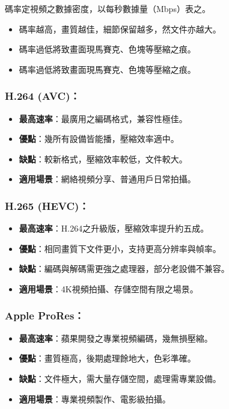 碼率定視頻之數據密度，以每秒數據量（Mbps）表之。

\begin{itemize}
  \item 碼率越高，畫質越佳，細節保留越多，然文件亦越大。
  \item 碼率過低將致畫面現馬賽克、色塊等壓縮之痕。
  \item 碼率過低將致畫面現馬賽克、色塊等壓縮之痕。
\end{itemize}


\subsubsection*{H.264 (AVC)：}

\begin{itemize}
  \item \textbf{最高速率}：最廣用之編碼格式，兼容性極佳。
  \item \textbf{優點}：幾所有設備皆能播，壓縮效率適中。
  \item \textbf{缺點}：較新格式，壓縮效率較低，文件較大。
  \item \textbf{適用場景}：網絡視頻分享、普通用戶日常拍攝。
\end{itemize}

\subsubsection*{H.265 (HEVC)：}

\begin{itemize}
  \item \textbf{最高速率}：H.264之升級版，壓縮效率提升約五成。
  \item \textbf{優點}：相同畫質下文件更小，支持更高分辨率與幀率。
  \item \textbf{缺點}：編碼與解碼需更強之處理器，部分老設備不兼容。
  \item \textbf{適用場景}：4K視頻拍攝、存儲空間有限之場景。
\end{itemize}

\subsubsection*{Apple ProRes：}

\begin{itemize}
  \item \textbf{最高速率}：蘋果開發之專業視頻編碼，幾無損壓縮。
  \item \textbf{優點}：畫質極高，後期處理餘地大，色彩準確。
  \item \textbf{缺點}：文件極大，需大量存儲空間，處理需專業設備。
  \item \textbf{適用場景}：專業視頻製作、電影級拍攝。
\end{itemize}

